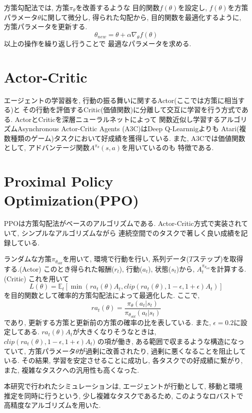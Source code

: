 \documentclass[../main]{subfiles}
\begin{document}
方策勾配法では, 方策$\pi_\theta$を改善するような
目的関数$f(\theta)$を設定し, 
$f(\theta)$を方策パラメータ$\theta$に関して微分し, 
得られた勾配から, 目的関数を最適化するように, 
方策パラメータを更新する.
\begin{equation}
\theta_{new} = \theta + \alpha \nabla_{\theta} f(\theta)
\end{equation}
以上の操作を繰り返し行うことで
最適なパラメータを求める.


\section{Actor-Critic}
エージェントの学習器を, 
行動の振る舞いに関するActor(ここでは方策に相当する)と
その行動を評価するCritic(価値関数)に分離して交互に学習を行う方式である.
ActorとCriticを深層ニューラルネットによって 
関数近似し学習するアルゴリズムAsynchronous Actor-Critic Agents
(A3C)はDeep Q-Learnnigよりも
Atari(複数種類のゲーム)タスクにおいて好成績を獲得している.
\cite{ref:actor_critic}
また, A3Cでは価値関数として, 
アドバンテージ関数$A^{\pi_\theta}(s, a)$を用いているのも
特徴である.


\section{Proximal Policy Optimization(PPO)\cite{ref:proximal_policy}}
PPOは方策勾配法がベースのアルゴリズムである.
Actor-Critic方式で実装されていて, 
シンプルなアルゴリズムながら
連続空間でのタスクで著しく良い成績を記録している.

ランダムな方策$\pi_{\theta_{old}}$を用いて,
環境で行動を行い, 系列データ($T$ステップ)を取得する.(Actor)
このとき得られた報酬($r_t$), 行動($a_t$), 状態($s_t$)から, 
$A^{\pi_{\theta_{old}}}_t$を計算する.(Critic)
これを用いて
\begin{equation}
\label{eq:lclip}
L(\theta) = \mathbb{E}_t[\min(ra_t(\theta)A_t, 
  clip(ra_t(\theta), 1-\epsilon, 1+\epsilon)A_t)]
\end{equation}
を目的関数として確率的方策勾配法によって最適化した.
ここで, 
\begin{equation}
ra_t(\theta)=
\frac{\pi_\theta(a_t|s_t)}{\pi_{\theta_{old}}(a_t|s_t)}
\end{equation}
であり, 更新する方策と更新前の方策の確率の比を表している. 
また, $\epsilon=0.2$に設定してある.
$ra_t(\theta)A_t$が大きくなりそうなときは, 
$clip(ra_t(\theta), 1-\epsilon, 1+\epsilon)A_t)$
の項が働き, ある範囲で収まるような構造になっていて, 
方策パラメータ$\theta$が過剰に改善されたり, 
過剰に悪くなることを阻止している.
その結果, 学習を安定させることに成功し, 
各タスクでの好成績に繋がり, また, 複雑なタスクへの汎用性も高くなった.

本研究で行われたシミュレーションは, 
エージェントが行動として, 
移動と環境推定を同時に行うという, 
少し複雑なタスクであるため,
このようなロバストで高精度なアルゴリズムを用いた.
\end{document}
